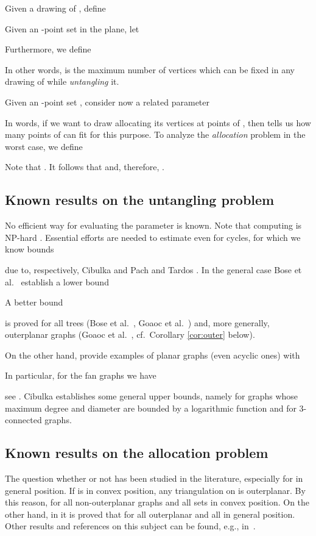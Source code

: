 \documentclass[reqno,12pt]{amsart}
\begin{document}
Given a drawing  of  , define

Given an -point set  in the plane, let

Furthermore, we define

In other words,  is the maximum number of vertices
which can be fixed in any drawing of  while \emph{untangling} it.

Given an -point set , consider now a related parameter

In words, if we want to draw  allocating its vertices at points of , then
 tells us how many points of  can fit for this purpose.
To analyze the \emph{allocation} problem in the worst case, we define

Note that .
It follows that  and, therefore,
.


\subsection{Known results on the untangling problem}

No efficient way for evaluating the parameter  is known.
Note that computing  is NP-hard \cite{merged,Ver}.
Essential efforts are needed to estimate  even for cycles, for which
we know bounds

due to, respectively, Cibulka \cite{Cib} and Pach and Tardos \cite{PTa}.
In the general case Bose et al.~\cite{Bose} establish a lower bound

A better bound
 
is proved for all trees (Bose et al.~\cite{Bose}, Goaoc et al.~\cite{merged}) 
and, more generally, outerplanar graphs (Goaoc et al.~\cite{merged}, cf.\ Corollary \ref{cor:outer} below). 

On the other hand, \cite{Bose,merged,KPRSV} provide examples of planar
graphs (even acyclic ones) with 

In particular, for the fan graphs  we have

see \cite{KPRSV}.
Cibulka \cite{Cib} establishes some general upper bounds, namely 
for graphs whose maximum degree and diameter are bounded by a logarithmic function and
 for 3-connected graphs.


\subsection{Known results on the allocation problem}

The question whether or not  has been studied in the literature,
especially for  in general position.
If  is in convex position, any triangulation on  is outerplanar.
By this reason,  for all non-outerplanar graphs  and all
sets  in convex position.
On the other hand, in \cite{GritzmannMPP91} it is proved that
 for all outerplanar  and all  in general position.
Other results and references on this subject can be found, e.g., in~\cite{GarciaHHTV09}.
\end{document}
